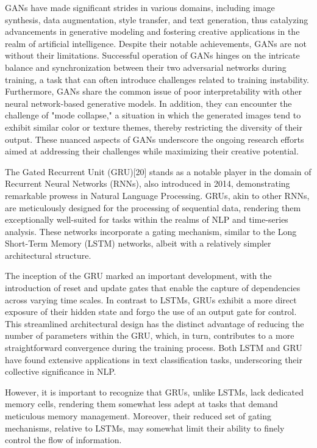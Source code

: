 \documentclass[conference]{IEEEtran}
\begin{document}
GANs have made significant strides in various domains, including image synthesis, data augmentation, style transfer, and text generation, thus catalyzing advancements in generative modeling and fostering creative applications in the realm of artificial intelligence. Despite their notable achievements, GANs are not without their limitations. Successful operation of GANs hinges on the intricate balance and synchronization between their two adversarial networks during training, a task that can often introduce challenges related to training instability. Furthermore, GANs share the common issue of poor interpretability with other neural network-based generative models. In addition, they can encounter the challenge of "mode collapse," a situation in which the generated images tend to exhibit similar color or texture themes, thereby restricting the diversity of their output. These nuanced aspects of GANs underscore the ongoing research efforts aimed at addressing their challenges while maximizing their creative potential.


The Gated Recurrent Unit (GRU)[20] stands as a notable player in the domain of Recurrent Neural Networks (RNNs), also introduced in 2014, demonstrating remarkable prowess in Natural Language Processing. GRUs, akin to other RNNs, are meticulously designed for the processing of sequential data, rendering them exceptionally well-suited for tasks within the realms of NLP and time-series analysis. These networks incorporate a gating mechanism, similar to the Long Short-Term Memory (LSTM) networks, albeit with a relatively simpler architectural structure.


The inception of the GRU marked an important development, with the introduction of reset and update gates that enable the capture of dependencies across varying time scales. In contrast to LSTMs, GRUs exhibit a more direct exposure of their hidden state and forgo the use of an output gate for control. This streamlined architectural design has the distinct advantage of reducing the number of parameters within the GRU, which, in turn, contributes to a more straightforward convergence during the training process. Both LSTM and GRU have found extensive applications in text classification tasks, underscoring their collective significance in NLP.


However, it is important to recognize that GRUs, unlike LSTMs, lack dedicated memory cells, rendering them somewhat less adept at tasks that demand meticulous memory management. Moreover, their reduced set of gating mechanisms, relative to LSTMs, may somewhat limit their ability to finely control the flow of information. 
\end{document}
